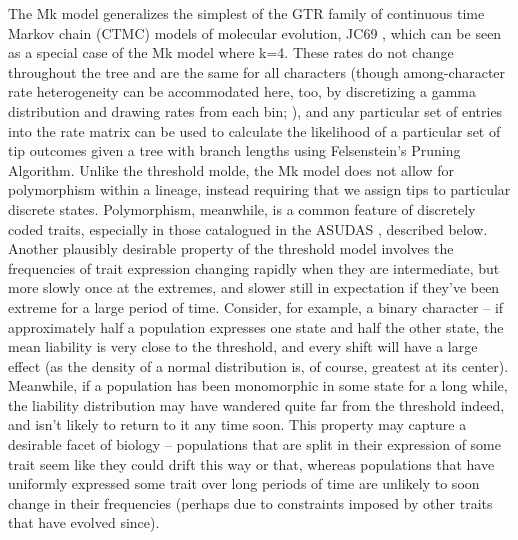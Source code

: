 \documentclass[12pt, twocolumn, twoside]{article}
\begin{document}
The Mk model generalizes the simplest of the GTR family of continuous time Markov chain (CTMC) models of molecular evolution, JC69 \citep{jukesEvolutionProteinMolecules1969b}, which can be seen as a special case of the Mk model where k=4. These rates do not change throughout the tree and are the same for all characters (though among-character rate heterogeneity can be accommodated here, too, by discretizing a gamma distribution and drawing rates from each bin; \citealt{yangMaximumLikelihoodPhylogenetic1994}), and any particular set of entries into the rate matrix can be used to calculate the likelihood of a particular set of tip outcomes given a tree with branch lengths using Felsenstein’s \citeyear{felsensteinMaximumlikelihoodEstimationEvolutionary1973b} Pruning Algorithm. Unlike the threshold molde, the Mk model does not allow for polymorphism within a lineage, instead requiring that we assign tips to particular discrete states. Polymorphism, meanwhile, is a common feature of discretely coded traits, especially in those catalogued in the ASUDAS \citep{scottAnthropologyModernHuman2018}, described below. Another plausibly desirable property of the threshold model involves the frequencies of trait expression changing rapidly when they are intermediate, but more slowly once at the extremes, and slower still in expectation if they’ve been extreme for a large period of time. Consider, for example, a binary character – if approximately half a population expresses one state and half the other state, the mean liability is very close to the threshold, and every shift will have a large effect (as the density of a normal distribution is, of course, greatest at its center). Meanwhile, if a population has been monomorphic in some state for a long while, the liability distribution may have wandered quite far from the threshold indeed, and isn’t likely to return to it any time soon. This property may capture a desirable facet of biology – populations that are split in their expression of some trait seem like they could drift this way or that, whereas populations that have uniformly expressed some trait over long periods of time are unlikely to soon change in their frequencies (perhaps due to constraints imposed by other traits that have evolved since). 
\end{document}
